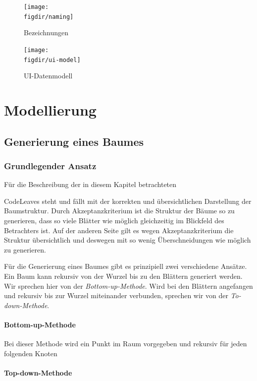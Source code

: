 \begin{figure}[htb]
  \texttt{[image: \\figdir/naming]}
  \caption{Bezeichnungen}
  \label{fig:naming}
\end{figure}


\begin{figure}[htb]
  \texttt{[image: \\figdir/ui-model]}
  \caption{UI-Datenmodell}
  \label{fig:ui-model}
\end{figure}

\chapter{Modellierung}
\label{ch:modelling}

\section{Generierung eines Baumes}

\subsection{Grundlegender Ansatz}
Für die Beschreibung der in diesem Kapitel betrachteten 

CodeLeaves steht und fällt mit der korrekten und übersichtlichen Darstellung der Baumstruktur. Durch Akzeptanzkriterium  ist die Struktur der Bäume so zu generieren, dass so viele Blätter wie möglich gleichzeitig im Blickfeld des Betrachters ist. Auf der anderen Seite gilt es wegen Akzeptanzkriterium  die Struktur übersichtlich und deswegen mit so wenig Überschneidungen wie möglich zu generieren.

Für die Generierung eines Baumes gibt es prinzipiell zwei verschiedene Ansätze. Ein Baum kann rekursiv von der Wurzel bis zu den Blättern generiert werden. Wir sprechen hier von der \textit{Bottom-up-Methode}. Wird bei den Blättern angefangen und rekursiv bis zur Wurzel miteinander verbunden, sprechen wir von der \textit{To-down-Methode}.

\subsubsection*{Bottom-up-Methode}
Bei dieser Methode wird ein Punkt im Raum vorgegeben und rekursiv für jeden folgenden Knoten

\subsubsection* {Top-down-Methode}


